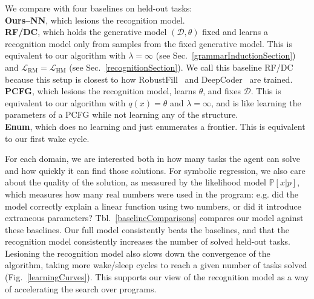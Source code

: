 \documentclass{article}
\newcommand{\probability}{\mathds{P}} %
\begin{document}
We compare  with four baselines on  held-out tasks:
\\\noindent \textbf{Ours--NN}, which lesions the recognition model.
\\\noindent \textbf{RF/DC}, which holds the generative model $(\mathcal{D},\theta)$ fixed and learns
a recognition model only from samples from the fixed generative model.
This is equivalent to our algorithm with $\lambda = \infty$ (see Sec.~\ref{grammarInductionSection})
and $\mathcal{L}_{\text{RM}} = \mathcal{L}_{\text{HM}}$ (see Sec.~\ref{recognitionSection}).
We call this baseline RF/DC because
this setup is closest to how RobustFill~\cite{devlin2017robustfill} and DeepCoder~\cite{balog2016deepcoder} are trained.
\\\noindent \textbf{PCFG}, which lesions the recognition model, learns $\theta$, and fixes $\mathcal{D}$.
This is equivalent to our algorithm with $q(x) = \theta$ and $\lambda = \infty$,
and is like learning the parameters of a PCFG while not learning any of the structure.
\\\noindent \textbf{Enum}, which does no learning and just enumerates a frontier.
This is equivalent to our first wake cycle.

For each domain,
we are interested both in how many tasks the
agent can solve and how quickly it can find those solutions.
For symbolic regression, we also care about the quality
of the solution, as measured by the likelihood model $\probability[x|p]$,
which measures how many
real numbers were used in the program: e.g. did the model correctly explain a linear function
using two numbers, or did it introduce extraneous parameters?
Tbl.~\ref{baselineComparisons}
compares our model against these baselines.
Our full model consistently
beats the baselines,
and that the recognition model 
consistently increases the number of solved held-out tasks.
Lesioning the recognition model also slows down the convergence of the algorithm,
taking more wake/sleep cycles to reach a given number of tasks solved (Fig.~\ref{learningCurves}).
This supports our view of the recognition model as a way of accelerating the search over programs.
\end{document}
